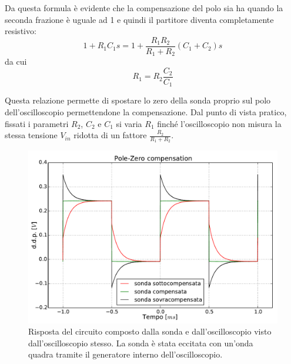 Da questa formula è evidente che la compensazione del polo sia ha quando la seconda frazione è uguale ad \num{1} e quindi il partitore diventa completamente resistivo:
\begin{equation*}
1+R_1C_1s = 1+\frac{R_1R_2}{R_1+R_2}(C_1+C_2)s
\end{equation*}
da cui
\begin{equation}
R_1 = R_2 \frac{C_2}{C_1}
\end{equation}

Questa relazione permette di spostare lo zero della sonda proprio sul polo dell'oscilloscopio permettendone la compensazione.
Dal punto di vista pratico, fissati i parametri $R_2$, $C_2$ e $C_1$ si varia $R_1$ finché l'oscilloscopio non misura la stessa tensione $V_{in}$ ridotta di un fattore $\frac{R_2}{R_1+R_2}$.

\begin{figure}[htpc]
\centering
\includegraphics[width=.65\textwidth]{../E08/latex/compensation.pdf}
\caption{Risposta del circuito composto dalla sonda e dall'oscilloscopio visto dall'oscilloscopio stesso. La sonda è stata eccitata con un'onda quadra tramite il generatore interno dell'oscilloscopio.}
\label{fig8:compensation}
\end{figure}

